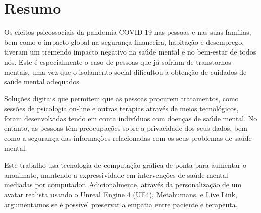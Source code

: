 \chapter*{Resumo}
\justify
Os efeitos psicossociais da pandemia COVID-19 nas pessoas e nas suas famílias, bem como o impacto global na segurança financeira, habitação e desemprego, tiveram um tremendo impacto negativo na saúde mental e no bem-estar de todos nós. Este é especialmente o caso de pessoas que já sofriam de transtornos mentais, uma vez que o isolamento social dificultou a obtenção de cuidados de saúde mental adequados.

Soluções digitais que permitem que as pessoas procurem tratamentos, como sessões de psicologia on-line e outras terapias através de meios tecnológicos, foram desenvolvidas tendo em conta indivíduos com doenças de saúde mental. No entanto, as pessoas têm preocupações sobre a privacidade dos seus dados, bem como a segurança das informações relacionadas com os seus problemas de saúde mental.

Este trabalho usa tecnologia de computação gráfica de ponta para aumentar o anonimato, mantendo a expressividade em intervenções de saúde mental mediadas por computador. Adicionalmente, através da personalização de um avatar realista usando o Unreal Engine 4 (UE4), Metahumans, e Live Link, argumentamos se é possível preservar a empatia entre paciente e terapeuta.

